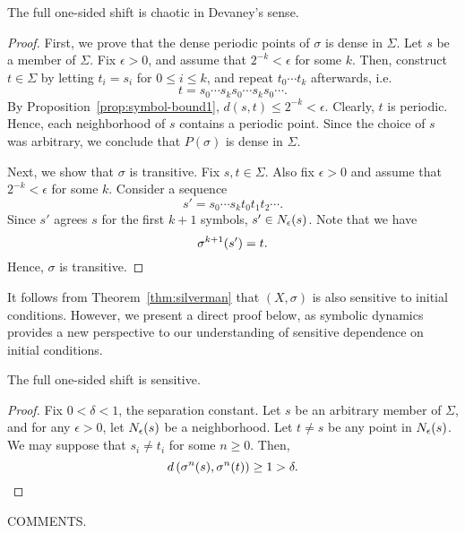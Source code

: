\documentclass[10pt,twoside]{book}
\begin{document}
\begin{theorem}
  The full one-sided shift is chaotic in Devaney's sense.
  \begin{proof}
    First, we prove that the dense periodic points of $\sigma$ is dense in $\Sigma$.
    Let $s$ be a member of $\Sigma$.
    Fix $\epsilon > 0$, and assume that $2^{-k} < \epsilon$ for some $k$.
    Then, construct $t \in \Sigma$ by letting $t_i = s_i$ for $0 \leq i \leq k$, and repeat $t_0 \cdots t_k$ afterwards, i.e.
    \begin{equation*}
      t = s_0 \cdots s_k s_0 \cdots s_k s_0 \cdots.
    \end{equation*}
    By Proposition~\ref{prop:symbol-bound1}, $d(s,t) \leq 2^{-k} < \epsilon$.
    Clearly, $t$ is periodic.
    Hence, each neighborhood of $s$ contains a periodic point.
    Since the choice of $s$ was arbitrary, we conclude that $P(\sigma)$ is dense in $\Sigma$.

    Next, we show that $\sigma$ is transitive.
    Fix $s,t \in \Sigma$.
    Also fix $\epsilon > 0$ and assume that $2^{-k} < \epsilon$ for some $k$.
    Consider a sequence
    \begin{equation*}
      s' = s_0 \cdots s_k t_0 t_1 t_2 \cdots.
    \end{equation*}
    Since $s'$ agrees $s$ for the first $k+1$ symbols, $s' \in N_{\epsilon}(s)$.
    Note that we have
    \begin{equation*}
      \sigma^{k+1}(s') = t.
    \end{equation*}
    Hence, $\sigma$ is transitive.
  \end{proof}
\end{theorem}
It follows from Theorem~\ref{thm:silverman} that $(X, \sigma)$ is also sensitive to initial conditions.
However, we present a direct proof below, as symbolic dynamics provides a new perspective to our understanding of sensitive dependence on initial conditions.
\begin{proposition}
  The full one-sided shift is sensitive.
  \begin{proof}
    Fix $0 < \delta < 1$, the separation constant.
    Let $s$ be an arbitrary member of $\Sigma$, and for any $\epsilon > 0$, let $N_{\epsilon}(s)$ be a neighborhood.
    Let $t \neq s$ be any point in $N_{\epsilon}(s)$.
    We may suppose that $s_i \neq t_i$ for some $n \geq 0$.
    Then,
    \begin{equation*}
      d\left( \sigma^{n}(s), \sigma^{n}(t) \right) \geq 1 > \delta.
    \end{equation*}
  \end{proof}
\end{proposition}
COMMENTS.
\end{document}
